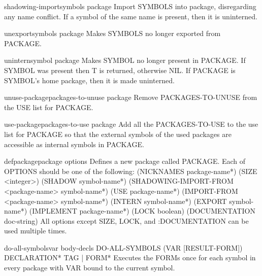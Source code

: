\begin{function}{shadowing-import}{symbols \op package}{}{}
  Import SYMBOLS into package, disregarding any name conflict. If
  a symbol of the same name is present, then it is uninterned.
\end{function}

\begin{function}{unexport}{symbols \op package}{}{}
  Makes SYMBOLS no longer exported from PACKAGE.
\end{function}

\begin{function}{unintern}{symbol \op package}{}{}
  Makes SYMBOL no longer present in PACKAGE. If SYMBOL was present then T is
returned, otherwise NIL. If PACKAGE is SYMBOL's home package, then it is made
uninterned.
\end{function}

\begin{function}{unuse-package}{packages-to-unuse \op package}{}{}
  Remove PACKAGES-TO-UNUSE from the USE list for PACKAGE.
\end{function}

\begin{function}{use-package}{packages-to-use \op package}{}{}
  Add all the PACKAGES-TO-USE to the use list for PACKAGE so that the
external symbols of the used packages are accessible as internal symbols in
PACKAGE.
\end{function}

\begin{macro}{defpackage}{package \rest options}{}{}
  Defines a new package called PACKAGE. Each of OPTIONS should be one of the
   following: 
    (NICKNAMES {package-name}*)
    (SIZE <integer>)
    (SHADOW {symbol-name}*)
    (SHADOWING-IMPORT-FROM <package-name> {symbol-name}*)
    (USE {package-name}*)
    (IMPORT-FROM <package-name> {symbol-name}*)
    (INTERN {symbol-name}*)
    (EXPORT {symbol-name}*)
    (IMPLEMENT {package-name}*)
    (LOCK boolean)
    (DOCUMENTATION doc-string)
   All options except SIZE, LOCK, and :DOCUMENTATION can be used multiple
   times.
\end{macro}

\begin{macro}{do-all-symbols}{var \body body-decls}{}{}
  DO-ALL-SYMBOLS (VAR [RESULT-FORM]) {DECLARATION}* {TAG | FORM}*
   Executes the FORMs once for each symbol in every package with VAR bound
   to the current symbol.
\end{macro}

